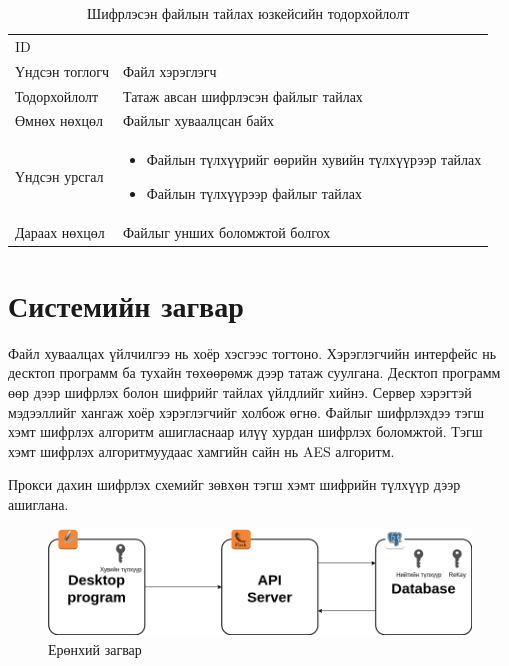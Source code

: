 \begin{table}[H]
    \footnotesize
    \centering
    \begin{tabularx}{\textwidth}{|>{\hsize=0.3\hsize}X|>{\hsize=0.7\hsize}X|}
        \hline
        \multicolumn{2}{|c|}{Шифрлэсэн файлын тайлах}        \\
        \hline
        ID             & 7                                   \\
        \hline
        Үндсэн тоглогч & Файл хэрэглэгч                      \\
        \hline
        Тодорхойлолт   & Татаж авсан шифрлэсэн файлыг тайлах \\
        \hline
        Өмнөх нөхцөл   & Файлыг хуваалцсан байх              \\
        \hline
        Үндсэн урсгал  &
        \begin{minipage}{\linewidth}
            \begin{itemize}
                \item Файлын түлхүүрийг өөрийн хувийн түлхүүрээр тайлах
                \item Файлын түлхүүрээр файлыг тайлах
            \end{itemize}
        \end{minipage}
        \\
        \hline
        Дараах нөхцөл  & Файлыг унших боломжтой болгох       \\
        \hline
    \end{tabularx}
    \caption{Шифрлэсэн файлын тайлах юзкейсийн тодорхойлолт}
\end{table}

\section{Системийн загвар}
Файл хуваалцах үйлчилгээ нь хоёр хэсгээс тогтоно. Хэрэглэгчийн интерфейс нь десктоп программ ба тухайн төхөөрөмж дээр татаж суулгана.
Десктоп программ өөр дээр шифрлэх болон шифрийг тайлах үйлдлийг хийнэ. Сервер хэрэгтэй мэдээллийг хангаж хоёр хэрэглэгчийг холбож өгнө. 
Файлыг шифрлэхдээ тэгш хэмт шифрлэх алгоритм ашигласнаар илүү хурдан шифрлэх боломжтой. Тэгш хэмт шифрлэх алгоритмуудаас хамгийн сайн нь AES алгоритм.

Прокси дахин шифрлэх схемийг зөвхөн тэгш хэмт шифрийн түлхүүр дээр ашиглана.
\begin{figure}[ht]
    \centering
    \includegraphics[scale=0.4]{Figures/system_schemes/main_diagram.drawio.png}
    \caption[Usecase diagram]{Ерөнхий загвар}
    \label{fig:main_scheme}
\end{figure}

